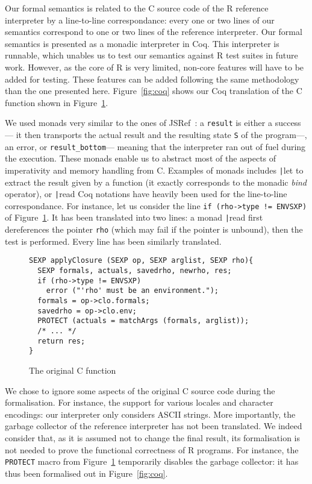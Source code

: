 \documentclass[9pt, sigplan, natbib=false, screen=true]{acmart}
\newcommand\Coq{Coq}
\newcommand\R{R}
\newcommand\Cn{C}
\begin{document}
Our formal semantics is related to the \Cn{} source code
of the \R{} reference interpreter
by a line-to-line correspondance:
every one or two lines of our semantics
correspond to one or two lines of the reference interpreter.
Our formal semantics is presented as a monadic interpreter in \Coq{}.
This interpreter is runnable,
which unables us to test our semantics against
\R{} test suites in future work.
However, as the core of \R{} is very limited,
non-core features will have to be added for testing.
These features can be added following the same methodology than the one presented here.
Figure~\ref{fig:coq} shows our \Coq{} translation
of the \Cn{} function shown in Figure~\ref{fig:c}.

We used monads very similar to the ones of JSRef~\parencite{popl14jscert}:
a \texttt{result} is either a success---%
it then transports the actual result and the resulting state
\texttt{S} of the program---,
an error, or \texttt{result_bottom}---%
meaning that the interpreter ran out of fuel during the execution.
These monads enable us to abstract most of the aspects
of imperativity and memory handling from \Cn{}.
Examples of monads includes
\texttt|let%
to extract the result given by a function
(it exactly corresponds to the monadic \emph{bind} operator),
or \texttt|read%
\Coq{} notations have heavily been used
for the line-to-line correspondance.
For instance, let us consider
the line \texttt{if (rho->type != ENVSXP)}
of Figure~\ref{fig:c}.
It has been translated into two lines:
a monad \texttt|read%
first dereferences the pointer \texttt{rho}
(which may fail if the pointer is unbound),
then the test is performed.
Every line has been similarly translated.

\begin{figure}
\begin{verbatim}
SEXP applyClosure (SEXP op, SEXP arglist, SEXP rho){
  SEXP formals, actuals, savedrho, newrho, res;
  if (rho->type != ENVSXP)
    error ("'rho' must be an environment.");
  formals = op->clo.formals;
  savedrho = op->clo.env;
  PROTECT (actuals = matchArgs (formals, arglist));
  /* ... */
  return res;
}
\end{verbatim}
    \caption{The original \Cn{} function}
    \label{fig:c}
\end{figure}

We chose to ignore some aspects of the original \Cn{} source code
during the formalisation.
For instance, the support for various locales and character encodings:
our interpreter only considers ASCII strings.
More importantly, the garbage collector of the reference interpreter
has not been translated.
We indeed consider that, as it is assumed not to change the final result,
its formalisation is not needed to prove the functional correctness
of \R{} programs.
For instance,
the \texttt{PROTECT} macro from Figure~\ref{fig:c}
temporarily disables the garbage collector:
it has thus been formalised out in Figure~\ref{fig:coq}.
\end{document}
